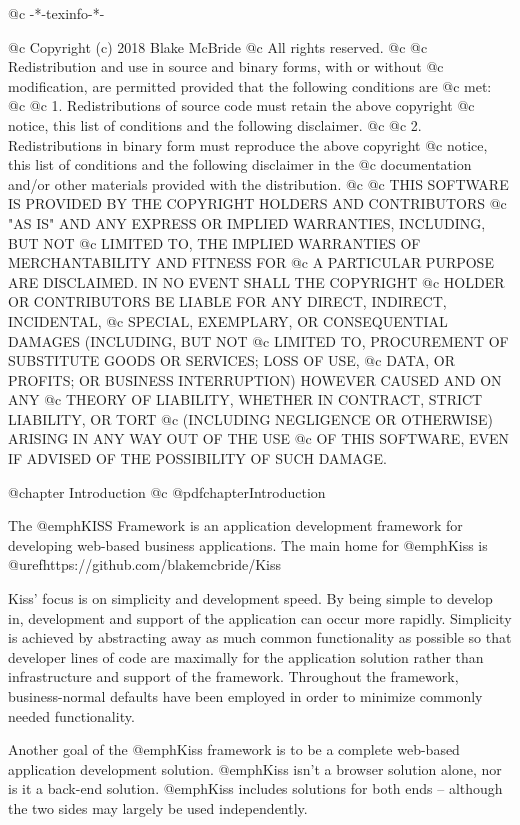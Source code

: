 @c -*-texinfo-*-

@c  Copyright (c) 2018 Blake McBride
@c  All rights reserved.
@c
@c  Redistribution and use in source and binary forms, with or without
@c  modification, are permitted provided that the following conditions are
@c  met:
@c
@c  1. Redistributions of source code must retain the above copyright
@c  notice, this list of conditions and the following disclaimer.
@c
@c  2. Redistributions in binary form must reproduce the above copyright
@c  notice, this list of conditions and the following disclaimer in the
@c  documentation and/or other materials provided with the distribution.
@c
@c  THIS SOFTWARE IS PROVIDED BY THE COPYRIGHT HOLDERS AND CONTRIBUTORS
@c  "AS IS" AND ANY EXPRESS OR IMPLIED WARRANTIES, INCLUDING, BUT NOT
@c  LIMITED TO, THE IMPLIED WARRANTIES OF MERCHANTABILITY AND FITNESS FOR
@c  A PARTICULAR PURPOSE ARE DISCLAIMED. IN NO EVENT SHALL THE COPYRIGHT
@c  HOLDER OR CONTRIBUTORS BE LIABLE FOR ANY DIRECT, INDIRECT, INCIDENTAL,
@c  SPECIAL, EXEMPLARY, OR CONSEQUENTIAL DAMAGES (INCLUDING, BUT NOT
@c  LIMITED TO, PROCUREMENT OF SUBSTITUTE GOODS OR SERVICES; LOSS OF USE,
@c  DATA, OR PROFITS; OR BUSINESS INTERRUPTION) HOWEVER CAUSED AND ON ANY
@c  THEORY OF LIABILITY, WHETHER IN CONTRACT, STRICT LIABILITY, OR TORT
@c  (INCLUDING NEGLIGENCE OR OTHERWISE) ARISING IN ANY WAY OUT OF THE USE
@c  OF THIS SOFTWARE, EVEN IF ADVISED OF THE POSSIBILITY OF SUCH DAMAGE.


@chapter Introduction
@c @pdfchapter{Introduction}

The @emph{KISS Framework} is an application development framework for
developing web-based business applications.  The main home for @emph{Kiss}
is @uref{https://github.com/blakemcbride/Kiss}


Kiss' focus is on
simplicity and development speed.  By being simple to develop in,
development and support of the application can occur more rapidly.
Simplicity is achieved by abstracting away as much common
functionality as possible so that developer lines of code are
maximally for the application solution rather than infrastructure and
support of the framework.  Throughout the framework, business-normal
defaults have been employed in order to minimize commonly needed
functionality.

Another goal of the @emph{Kiss} framework is to be a complete web-based
application development solution.  @emph{Kiss} isn't a browser solution
alone, nor is it a back-end solution.  @emph{Kiss} includes solutions for
both ends -- although the two sides may largely be used independently.

